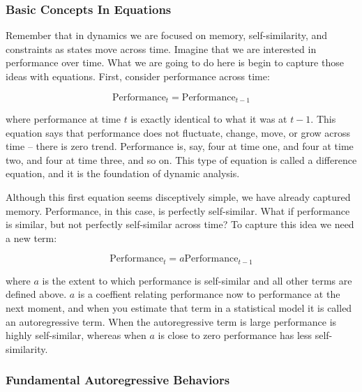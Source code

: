 \documentclass[english,,man]{apa6}
\theoremstyle{definition}
\theoremstyle{definition}
\theoremstyle{definition}
\theoremstyle{remark}
\begin{document}
\hypertarget{basic-concepts-in-equations}{%
\subsubsection{Basic Concepts In
Equations}\label{basic-concepts-in-equations}}

Remember that in dynamics we are focused on memory, self-similarity, and
constraints as states move across time. Imagine that we are interested
in performance over time. What we are going to do here is begin to
capture those ideas with equations. First, consider performance across
time:

\begin{equation}
\textrm{Performance}_{t} = \textrm{Performance}_{t-1}
\end{equation}

\noindent where performance at time \(t\) is exactly identical to what
it was at \(t-1\). This equation says that performance does not
fluctuate, change, move, or grow across time -- there is zero trend.
Performance is, say, four at time one, and four at time two, and four at
time three, and so on. This type of equation is called a difference
equation, and it is the foundation of dynamic analysis.

Although this first equation seems disceptively simple, we have already
captured memory. Performance, in this case, is perfectly self-similar.
What if performance is similar, but not perfectly self-similar across
time? To capture this idea we need a new term:

\begin{equation}
\textrm{Performance}_{t} = a \textrm{Performance}_{t-1}
\end{equation}

\noindent where \(a\) is the extent to which performance is self-similar
and all other terms are defined above. \(a\) is a coeffient relating
performance now to performance at the next moment, and when you estimate
that term in a statistical model it is called an autoregressive term.
When the autoregressive term is large performance is highly
self-similar, whereas when \(a\) is close to zero performance has less
self-similarity.

\hypertarget{fundamental-autoregressive-behaviors}{%
\subsubsection{Fundamental Autoregressive
Behaviors}\label{fundamental-autoregressive-behaviors}}
\end{document}
